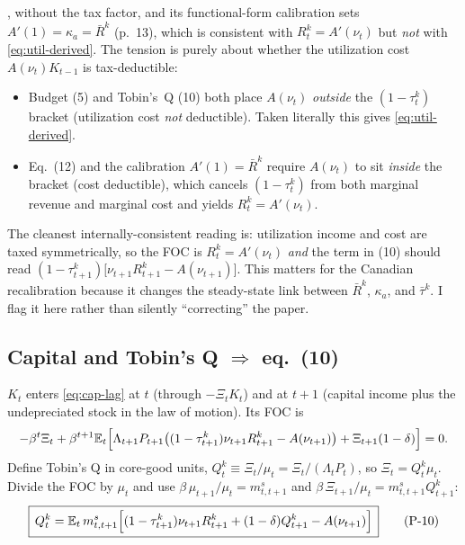 \begin{remark}\label{rem:util}
, without the tax factor, and its
functional-form calibration sets $A'(1)=\kappa_a=\bar R^k$ (p.\ 13), which is consistent with
$R^k_t=A'(\nu_t)$ but \emph{not} with \eqref{eq:util-derived}. The tension is purely about whether the
utilization cost $A(\nu_t)K_{t-1}$ is tax-deductible:
\begin{itemize}[nosep]
  \item Budget (5) and Tobin's~Q (10) both place $A(\nu_t)$ \emph{outside} the $(1-\tau^k_t)$ bracket
  (utilization cost \emph{not} deductible). Taken literally this gives \eqref{eq:util-derived}.
  \item Eq.\ (12) and the calibration $A'(1)=\bar R^k$ require $A(\nu_t)$ to sit \emph{inside} the
  bracket (cost deductible), which cancels $(1-\tau^k_t)$ from both marginal revenue and marginal cost
  and yields $R^k_t=A'(\nu_t)$.
\end{itemize}
The cleanest internally-consistent reading is: utilization income and cost are taxed symmetrically, so
the FOC is $R^k_t=A'(\nu_t)$ \emph{and} the term in (10) should read
$(1-\tau^k_{t+1})\big[\nu_{t+1}R^k_{t+1}-A(\nu_{t+1})\big]$. This matters for the Canadian
recalibration because it changes the steady-state link between $\bar R^k$, $\kappa_a$, and $\bar\tau^k$.
I flag it here rather than silently ``correcting'' the paper.
\end{remark}

\subsection{Capital and Tobin's Q \texorpdfstring{$\Rightarrow$}{=>} eq.\ (10)}
$K_t$ enters \eqref{eq:cap-lag} at $t$ (through $-\Xi_t K_t$) and at $t+1$ (capital income plus the
undepreciated stock in the law of motion). Its FOC is
\[
-\beta^t\Xi_t+\beta^{t+1}\mathbb{E}_t\Big[\Lambda_{t+1}P_{t+1}\big((1-\tau^k_{t+1})\nu_{t+1}R^k_{t+1}-A(\nu_{t+1})\big)
+\Xi_{t+1}(1-\delta)\Big]=0.
\]
Define Tobin's Q in core-good units, $Q^k_t\equiv\Xi_t/\mu_t=\Xi_t/(\Lambda_tP_t)$, so
$\Xi_t=Q^k_t\mu_t$. Divide the FOC by $\mu_t$ and use $\beta\,\mu_{t+1}/\mu_t=m^s_{t,t+1}$ and
$\beta\,\Xi_{t+1}/\mu_t=m^s_{t,t+1}Q^k_{t+1}$:
\begin{equation}\label{eq:10}
\boxed{\,Q^k_t=\mathbb{E}_t\,m^s_{t,t+1}\Big[(1-\tau^k_{t+1})\nu_{t+1}R^k_{t+1}+(1-\delta)Q^k_{t+1}-A(\nu_{t+1})\Big]\,}
\tag{P-10}
\end{equation}

